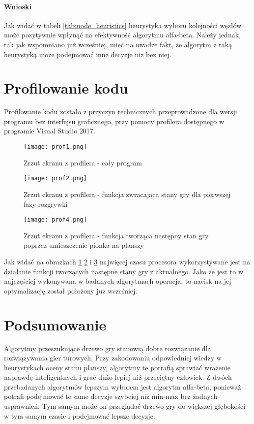 \documentclass{article}
\begin{document}
	\paragraph{Wnioski}
	Jak widać w tabeli \ref{tab:node_heuristics} heurystyka wyboru kolejności węzłów może pozytywnie wpłynąć na efektywność algorytmu alfa-beta. Należy jednak, tak jak wspomniano już wcześniej, mieć na uwadze fakt, że algorytm z taką heurystyką może podejmować inne decyzje niż bez niej.
	\section{Profilowanie kodu}
	Profilowanie kodu zostało z przyczyn technicznych przeprowadzone dla wersji programu bez interfejsu graficznego, przy pomocy profilera dostępnego w programie Visual Studio 2017.
	\begin{figure}[H]
		\centering
		\texttt{[image: prof1.png]}
		\caption{Zrzut ekranu z profilera - cały program}
		\label{fig:prof1}
	\end{figure}
	\begin{figure}[H]
		\centering
		\texttt{[image: prof2.png]}
		\caption{Zrzut ekranu z profilera - funkcja zwracająca stany gry dla pierwszej fazy rozgrywki}
		\label{fig:prof2}
	\end{figure}
	\begin{figure}[H]
		\centering
		\texttt{[image: prof4.png]}
		\caption{Zrzut ekranu z profilera - funkcja tworząca następny stan gry poprzez umieszczenie pionka na planszy}
		\label{fig:prof3}
	\end{figure}
	Jak widać na obrazkach \ref{fig:prof1} \ref{fig:prof2} i \ref{fig:prof3} najwięcej czasu procesora wykorzystywane jest na działanie funkcji tworzących następne stany gry z aktualnego. Jako że jest to w najczęściej wykonywana w badanych algorytmach operacja, to nacisk na jej optymalizację został położony już wcześniej.
	\section{Podsumowanie}
	Algorytmy przeszukujące drzewo gry stanowią dobre rozwiązanie dla rozwiązywania gier turowych. Przy zakodowaniu odpowiedniej wiedzy w heurystykach oceny stanu planszy, algorytmy te potrafią sprawiać wrażenie naprawdę inteligentnych i grać dużo lepiej niż przeciętny człowiek. Z dwóch przebadanych algorytmów lepszym wyborem jest algorytm alfa-beta, ponieważ potrafi podejmować te same decyzje szybciej niż min-max bez żadnych usprawnień. Tym samym może on przeglądać drzewo gry do większej głębokości w tym samym czasie i podejmować lepsze decyzje.
\end{document}
